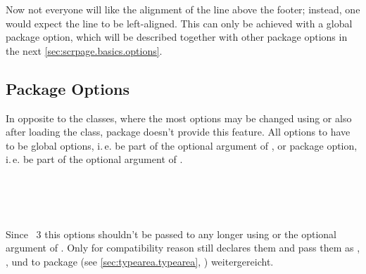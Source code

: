 %
Now not everyone will like the alignment of the line above the footer;
instead, one would expect the line to be left-aligned. This can only
be achieved with a global package option, which will be described
together with other package options in the next
\autoref{sec:scrpage.basics.options}.%
%


\subsection{Package Options}
\label{sec:scrpage.basics.options}

In opposite to the \KOMAScript{} classes, where the most options may be
changed using  or  also after loading the
class, package  doesn't provide this feature. All options to  have to be global options,
i.\,e. be part of the optional argument of , or
package option, i.\,e. be part of the optional argument of .

\begin{Declaration}
\\
\\
\\
\end{Declaration}%
%
%
Since \KOMAScript~3
this options shouldn't be passed to  any longer using
 or the optional argument of
. Only for compatibility reason  still
declares them and pass them as ,
,  und
 to package  (see
\autoref{sec:typearea.typearea},
) weitergereicht.
%


